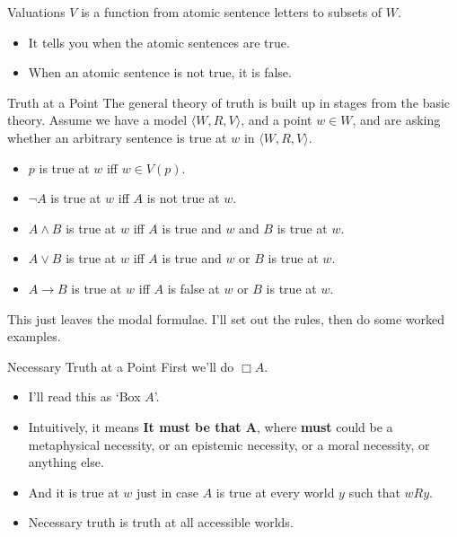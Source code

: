 \documentclass[
  14pt,
  letterpaper,
  ignorenonframetext,
  aspectratio=169,
]{beamer}
\providecommand{\tightlist}{%
  \setlength{\itemsep}{0pt}\setlength{\parskip}{0pt}}\usepackage{longtable,booktabs,array}
\begin{document}
\begin{frame}{Valuations}
\protect\hypertarget{valuations-1}{}
\(V\) is a function from atomic sentence letters to subsets of \(W\).

\begin{itemize}[<+->]
\tightlist
\item
  It tells you when the atomic sentences are true.
\item
  When an atomic sentence is not true, it is false.
\end{itemize}
\end{frame}

\begin{frame}{Truth at a Point}
\protect\hypertarget{truth-at-a-point}{}
The general theory of truth is built up in stages from the basic theory.
Assume we have a model \(\langle W, R, V\rangle\), and a point
\(w \in W\), and are asking whether an arbitrary sentence is true at
\(w\) in \(\langle W, R, V\rangle\).

\begin{itemize}[<+->]
\tightlist
\item
  \(p\) is true at \(w\) iff \(w \in V(p)\).
\item
  \(\neg A\) is true at \(w\) iff \(A\) is not true at \(w\).
\item
  \(A \wedge B\) is true at \(w\) iff \(A\) is true and \(w\) and \(B\)
  is true at \(w\).
\item
  \(A \vee B\) is true at \(w\) iff \(A\) is true and \(w\) or \(B\) is
  true at \(w\).
\item
  \(A \rightarrow B\) is true at \(w\) iff \(A\) is false at \(w\) or
  \(B\) is true at \(w\).
\end{itemize}

This just leaves the modal formulae. I'll set out the rules, then do
some worked examples.
\end{frame}

\begin{frame}{Necessary Truth at a Point}
\protect\hypertarget{necessary-truth-at-a-point}{}
First we'll do \(\Box A\).

\begin{itemize}[<+->]
\tightlist
\item
  I'll read this as `Box \(A\)'.
\item
  Intuitively, it means \textbf{It must be that A}, where \textbf{must}
  could be a metaphysical necessity, or an epistemic necessity, or a
  moral necessity, or anything else.
\item
  And it is true at \(w\) just in case \(A\) is true at every world
  \(y\) such that \(wRy\).
\item
  Necessary truth is truth at all accessible worlds.
\end{itemize}
\end{frame}
\end{document}
